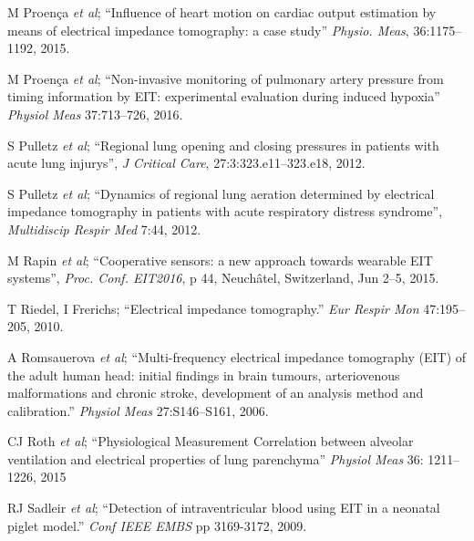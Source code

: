 \documentclass[10pt,journal]{IEEEtran}\def\TBLWIDA{15mm}\def\TBLWIDB{60mm}
\newcommand{\ifmaxthree}[2]{#2 {\em et al}; }
\begin{document}
\begin{thebibliography}{00}
\ifmaxthree{
M Proença, F Braun, M Rapin, J Solà, A Adler, B Grychtol, S Böhm, M Lemay, J-P Thiran,
}{
M Proença
}
``Influence of heart motion on cardiac output estimation by means of electrical impedance tomography: a case study''
{\em Physio. Meas}, 36:1175--1192, 2015.

\ifmaxthree{
M Proença, F Braun, J Solà, A Adler,
M Lemay, J-P Thiran, SF Rimoldi
}{
M Proença
}
``Non-invasive monitoring of pulmonary artery pressure from timing information by EIT: experimental evaluation during induced hypoxia''
{\em Physiol Meas} 37:713--726, 2016.

\ifmaxthree{
S Pulletz, A Adler, M Kott, G Elke, B Gawelczyk, D Schädler, G Zick, N Weiler, I Frerichs
}{
S Pulletz
}
``Regional lung opening and closing pressures in patients with acute lung injurys'',
{\em J Critical Care}, 27:3:323.e11--323.e18, 2012. 

\ifmaxthree{
S Pulletz, M Kott, G Elke, D Schadler, B Vogt, N Weiler, I Frerichs
}{
S Pulletz
}
``Dynamics of
regional lung aeration determined by electrical impedance tomography in patients with acute
respiratory distress syndrome'',
{\em Multidiscip Respir Med} 7:44, 2012.

\ifmaxthree{
M Rapin, M Proença, F Braun, J Solà, O Chételat,
}{
M Rapin
}
``Cooperative sensors: a new approach towards wearable EIT systems'',
{\em Proc. Conf. EIT2016}, p 44, Neuchâtel, Switzerland, Jun 2--5, 2015.

T Riedel, I Frerichs;
``Electrical impedance tomography.''
{\em Eur  Respir  Mon} 47:195--205, 2010.

\ifmaxthree{
A Romsauerova, A McEwan, L Horesh, R Yerworth, RH Bayford, DS Holder
}{
A Romsauerova
}
``Multi-frequency electrical impedance tomography (EIT) of the adult human head: initial findings in brain tumours, arteriovenous malformations and chronic stroke, development of an analysis method and calibration.''
{\em Physiol Meas} 27:S146--S161, 2006. %

\ifmaxthree{
CJ Roth, A Ehrl, T Becher, I Frerichs, JC Schittny, N Weiler, WA Wall, 
}{
CJ Roth
}
``Physiological Measurement
Correlation between alveolar ventilation and 
electrical properties of lung parenchyma''
{\em Physiol Meas} 36: 1211--1226, 2015

\ifmaxthree{
RJ Sadleir, T Tang, AS Tucker, P Borum, M Weiss
}{
RJ Sadleir
}
``Detection of intraventricular blood using EIT in a neonatal piglet model.''
{\em Conf IEEE EMBS} pp 3169-3172, 2009.


\end{thebibliography}
\end{document}
